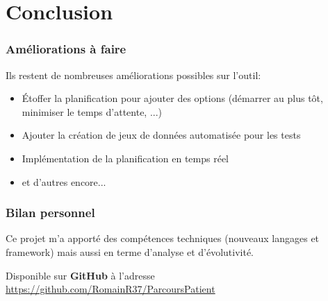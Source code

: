 \documentclass{beamer}
\begin{document}
\section*{Conclusion}

\begin{frame}
\frametitle{Améliorations à faire}

Ils restent de nombreuses améliorations possibles sur l'outil:

\bigbreak

\begin{itemize}
	\item Étoffer la planification pour ajouter des options (démarrer au plus tôt, minimiser le temps d'attente, ...)
	\item Ajouter la création de jeux de données automatisée pour les tests
	\item Implémentation de la planification en temps réel
	\item et d'autres encore...
\end{itemize}

\end{frame}

\begin{frame}
\frametitle{Bilan personnel}

Ce projet m'a apporté des compétences techniques (nouveaux langages et framework) mais aussi en terme d'analyse et d'évolutivité.

\bigbreak

Disponible sur \textbf{GitHub} à l'adresse \url{https://github.com/RomainR37/ParcoursPatient}

\end{frame}
\end{document}
